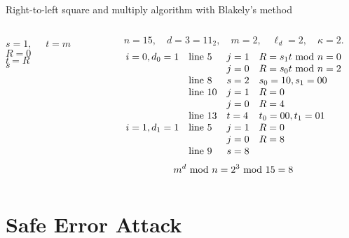 \begin{frame}{Right-to-left square and multiply algorithm with Blakely's method}
\begin{columns}[T] %
\begin{column}{.45\textwidth}
{\small
{
\setlength{\interspacetitleruled}{0pt}%
\setlength{\algotitleheightrule}{0pt}%
    \begin{algorithm}[H]
$s= 1,\quad$
$t = m$\\
 	{
            $R=0$\\
            $t=R$\\
  	}
  	\Return $s$\\
\end{algorithm}}}
\end{column}%
\hfill%
\begin{column}{.58\textwidth}
\begin{example}
\[
n=15,\quad d=3=11_2,\quad m=2,\quad \ell_d=2,\quad \kappa=2.
\]
\[
\begin{array}{llll}
i=0,d_0=1 & \text{line 5}  & j=1 & R=s_1t\textrm{~mod~} n=0\\
   &  & j=0 & R=s_0t\textrm{~mod~} n=2\\
   & \text{line 8}  & s=2 & s_0=10, s_1=00\\
  &  \text{line 10} & j=1 & R=0\\
   & & j=0 & R=4\\
   &\text{line 13} & t=4 & t_{0}=00, t_{1}=01\\
i=1,d_1=1 & \text{line 5} & j=1 & R=0\\
& & j=0 & R=8\\
& \text{line 9} & s=8
\end{array}
\]
\[
m^d\textrm{~mod~} n=2^3\textrm{~mod~}15=8
\]
\end{example}
\end{column}%
\end{columns}
\end{frame}


\section{Safe Error Attack}
\begin{frame}{\VideoName}
    \tableofcontents[currentsection]
\end{frame}

